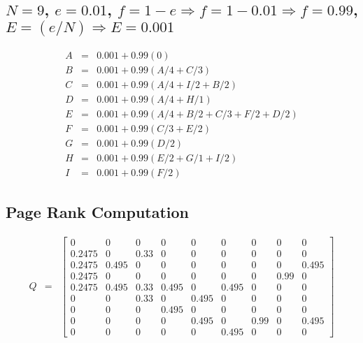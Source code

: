 \documentclass{article}
\begin{document}
\subsection{ $N = 9$, $e = 0.01$, $f = 1 - e \Rightarrow f = 1 - 0.01 \Rightarrow f = 0.99$, $E = (e/N) \Rightarrow E = 0.001$}
\[
\begin{array}{rcl}A & = & 0.001 + 0.99(0)\\ B & = & 0.001 + 0.99(A/4 + C/3) \\ C & = & 0.001 + 0.99(A/4 + I/2 + B/2) \\ D & = & 0.001 + 0.99(A/4 + H/1) \\ E & = &0.001 + 0.99(A/4+B/2 + C/3 + F/2 + D/2) \\ F & = & 0.001 + 0.99(C/3 + E/2) \\ G & = & 0.001 + 0.99(D/2) \\ H & = & 0.001 + 0.99(E/2 + G/1 + I/2) \\ I & = & 0.001 + 0.99(F/2)
\end{array}
\]
\subsection{\textbf{Page Rank Computation}}
\[
\begin{array}{lcl}Q & = &
\begin{bmatrix} 0 & 0 & 0 & 0 & 0 & 0 & 0 & 0 & 0 \\ 0.2475 & 0 & 0.33 & 0 & 0 & 0 & 0 & 0 & 0 \\ 0.2475 & 0.495 & 0 & 0 & 0 & 0 & 0 & 0 & 0.495 \\ 0.2475 & 0 & 0 & 0 & 0& 0 & 0 & 0.99 & 0 \\ 0.2475 & 0.495 & 0.33 & 0.495 & 0 & 0.495 & 0 & 0 & 0 \\ 0 & 0 & 0.33 & 0 & 0.495 & 0 & 0 & 0 & 0 \\ 0 & 0 & 0 & 0.495 & 0 & 0 & 0 & 0 & 0 \\ 0 & 0 & 0 & 0 & 0.495 & 0 & 0.99 & 0 & 0.495 \\ 0 & 0 & 0 & 0 & 0 & 0.495 & 0 & 0 & 0
\end{bmatrix}
\end{array}
\]
\end{document}
